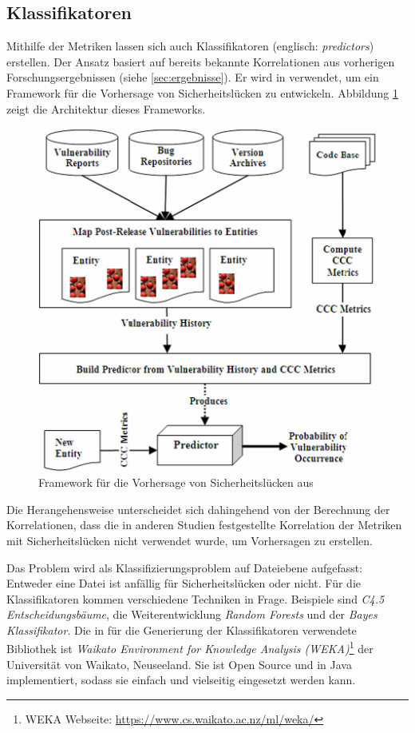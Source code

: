 \subsection{Klassifikatoren}
Mithilfe der Metriken lassen sich auch Klassifikatoren (englisch: \emph{predictors}) erstellen.
Der Ansatz basiert auf bereits bekannte Korrelationen aus vorherigen Forschungsergebnissen (siehe \ref{sec:ergebnisse}).
Er wird in \cite{chowdhury_zulkernine_2009} verwendet, um ein Framework für die Vorhersage von Sicherheitslücken zu entwickeln.
Abbildung \ref{fig:framework} zeigt die Architektur dieses Frameworks.
\begin{figure}
	\includegraphics[width=\textwidth]{img/framework.png}
	\caption{Framework für die Vorhersage von Sicherheitslücken aus \cite{chowdhury_zulkernine_2009}}
	\label{fig:framework}
\end{figure}
Die Herangehensweise unterscheidet sich dahingehend von der Berechnung der Korrelationen, dass die in anderen Studien festgestellte Korrelation der Metriken mit Sicherheitslücken nicht verwendet wurde, um Vorhersagen zu erstellen.

Das Problem wird als Klassifizierungsproblem auf Dateiebene aufgefasst:
Entweder eine Datei ist anfällig für Sicherheitslücken oder nicht.
Für die Klassifikatoren kommen verschiedene Techniken in Frage.
Beispiele sind \emph{C4.5 Entscheidungsbäume}\cite{decision_trees}, die Weiterentwicklung \emph{Random Forests} und der \emph{Bayes Klassifikator}.
Die in \cite{chowdhury_zulkernine_2009} für die Generierung der Klassifikatoren verwendete Bibliothek ist \emph{Waikato Environment for Knowledge Analysis (WEKA)}\footnote{WEKA Webseite: \url{https://www.cs.waikato.ac.nz/ml/weka/}} der Universität von Waikato, Neuseeland.
Sie ist Open Source und in Java implementiert, sodass sie einfach und vielseitig eingesetzt werden kann.

